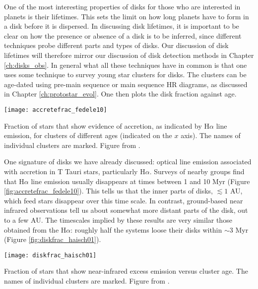 One of the most interesting properties of disks for those who are interested in planets is their lifetimes. This sets the limit on how long planets have to form in a disk before it is dispersed. In discussing disk lifetimes, it is important to be clear on how the presence or absence of a disk is to be inferred, since different techniques probe different parts and types of disks. Our discussion of disk lifetimes will therefore mirror our discussion of disk detection methods in Chapter \ref{ch:disks_obs}. In general what all these techniques have in common is that one uses some technique to survey young star clusters for disks. The clusters can be age-dated using pre-main sequence or main sequence HR diagrams, as discussed in Chapter \ref{ch:protostar_evol}. One then plots the disk fraction against age.

\begin{marginfigure}
\texttt{[image: accretefrac\_fedele10]}
\caption[Accreting star fraction versus cluster age]{
\label{fig:accretefrac_fedele10}
Fraction of stars that show evidence of accretion, as indicated by H$\alpha$ line emission, for clusters of different ages (indicated on the $x$ axis). The names of individual clusters are marked. Figure from \citet{fedele10a}.
}
\end{marginfigure}

One signature of disks we have already discussed: optical line emission associated with accretion in T Tauri stars, particularly H$\alpha$. Surveys of nearby groups find that H$\alpha$ line emission usually disappears at times between 1 and 10 Myr (Figure \ref{fig:accretefrac_fedele10}). This tells us that the inner parts of disks, $\lesssim 1$ AU, which feed stars disappear over this time scale. In contrast, ground-based near infrared observations tell us about somewhat more distant parts of the disk, out to a few AU. The timescales implied by these results are very similar those obtained from the H$\alpha$: roughly half the systems loose their disks within $\sim 3$ Myr (Figure \ref{fig:diskfrac_haisch01}).

\begin{marginfigure}
\texttt{[image: diskfrac\_haisch01]}
\caption[Near infrared excess fraction versus cluster age]{
\label{fig:diskfrac_haisch01}
Fraction of stars that show near-infrared excess emission versus cluster age. The names of individual clusters are marked. Figure from \citet{haisch01a}.
}
\end{marginfigure}

